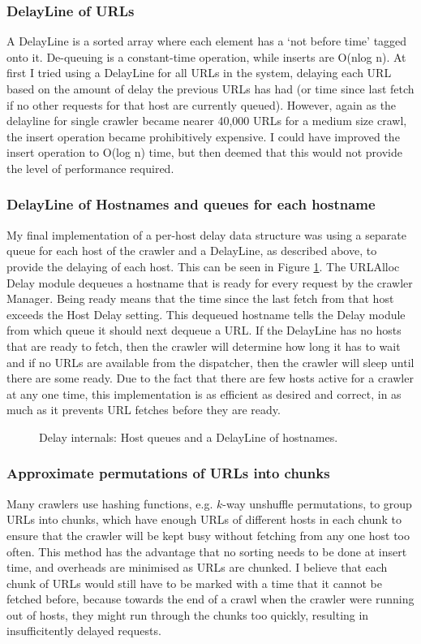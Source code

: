 \subsubsection{DelayLine of URLs}
A DelayLine\cite{site1} is a sorted array where each element has a `not before time' tagged onto it. De-queuing is a constant-time operation, while inserts are O(nlog n). At first I tried using a DelayLine for all URLs in the system, delaying each URL based on the amount of delay the previous URLs has had (or time since last fetch if no other requests for that host are currently queued). However, again as the delayline for single crawler became nearer 40,000 URLs for a medium size crawl, the insert operation became prohibitively expensive. I could have improved the insert operation to O(log n) time, but then deemed that this would not provide the level of performance required.

\subsubsection{DelayLine of Hostnames and queues for each hostname}
My final implementation of a per-host delay data structure was using a separate queue for each host of the crawler and a DelayLine, as described above, to provide the delaying of each host. This can be seen in Figure \ref{fig-delaylinehosts}. The URLAlloc Delay module dequeues a hostname that is ready for every request by the crawler Manager. Being ready means that the time since the last fetch from that host exceeds the Host Delay setting. This dequeued hostname tells the Delay module from which queue it should next dequeue a URL. If the DelayLine has no hosts that are ready to fetch, then the crawler will determine how long it has to wait and if no URLs are available from the dispatcher, then the crawler will sleep until there are some ready. Due to the fact that there are few hosts active for a crawler at any one time, this implementation is as efficient as desired and correct, in as much as it prevents URL fetches before they are ready.

\begin{figure}[h]
  \centerline{
  }
  \caption{Delay internals: Host queues and a DelayLine of hostnames.}
  \label{fig-delaylinehosts}
\end{figure}

\subsubsection{Approximate permutations of URLs into chunks}
Many crawlers use hashing functions, e.g. $k$-way unshuffle permutations\cite{ref1}, to group URLs into chunks, which have enough URLs of different hosts in each chunk to ensure that the crawler will be kept busy without fetching from any one host too often. This method has the advantage that no sorting needs to be done at insert time, and overheads are minimised as URLs are chunked. I believe that each chunk of URLs would still have to be marked with a time that it cannot be fetched before, because towards the end of a crawl when the crawler were running out of hosts, they might run through the chunks too quickly, resulting in insufficitently delayed requests.
